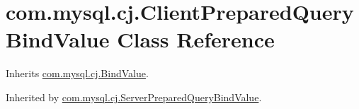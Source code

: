 \hypertarget{classcom_1_1mysql_1_1cj_1_1_client_prepared_query_bind_value}{}\section{com.\+mysql.\+cj.\+Client\+Prepared\+Query\+Bind\+Value Class Reference}
\label{classcom_1_1mysql_1_1cj_1_1_client_prepared_query_bind_value}


Inherits \mbox{\hyperlink{interfacecom_1_1mysql_1_1cj_1_1_bind_value}{com.\+mysql.\+cj.\+Bind\+Value}}.



Inherited by \mbox{\hyperlink{classcom_1_1mysql_1_1cj_1_1_server_prepared_query_bind_value}{com.\+mysql.\+cj.\+Server\+Prepared\+Query\+Bind\+Value}}.

